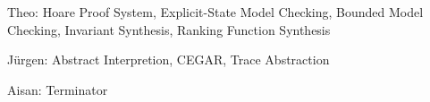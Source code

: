 \documentclass[a4paper]{article}
\begin{document}
\newpage
{}
{}

\label{pdf:invariant_synthesis}

\newpage
{}
{}

\label{pdf:ranking_function_synthesis}

\newpage
{}
{}

\label{pdf:terminator}

\newpage
{}
{}
\begin{betterlist}
	\item \alert{Theo:} Hoare Proof System, Explicit-State Model Checking, Bounded Model Checking, Invariant Synthesis, Ranking Function Synthesis
	\item \alert{Jürgen:} Abstract Interpretion, CEGAR, Trace Abstraction
	\item \alert{Aisan:} Terminator
\end{betterlist}
\end{document}
